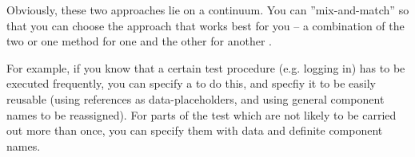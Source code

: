 Obviously, these two approaches lie on a continuum. You can ''mix-and-match'' so that you can choose the  approach that works best for you -- a combination of the two or one method for one \gdcase{} and the other for another \gdcase{}. 

For example, if you know that a certain test procedure (e.g. logging in) has to be executed frequently, you can specify a \gdcase{} to do this, and specfiy it to be easily reusable (using references as data-placeholders, and using general component names to be reassigned). For parts of the test which are not likely to be carried out more than once, you can specify them with data and definite component names. 
